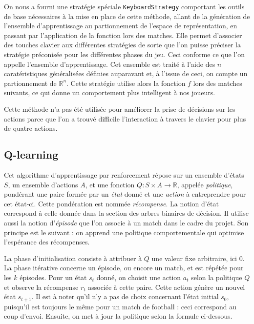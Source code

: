 \documentclass[12pt,a4paper]{article}
\begin{document}
On nous a fourni une strat\'egie sp\'eciale \texttt{KeyboardStrategy} 
comportant les outils de base n\'ecessaires \`a la mise en place de cette 
m\'ethode, allant de la g\'en\'eration de l'ensemble d'apprentissage au 
partionnement de l'espace de repr\'esentation, en passant par l'application de 
la fonction lors des matches. 
Elle permet d'associer des touches clavier aux diff\'erentes strat\'egies de 
sorte que l'on puisse pr\'eciser la strat\'egie pr\'econis\'ee pour les 
diff\'erentes phases du jeu. Ceci conforme ce que l'on appelle l'ensemble 
d'apprentissage. Cet ensemble est trait\'e \`a l'aide des $n$ carat\'eristiques 
g\'en\'eralis\'ees d\'efinies auparavant et, \`a l'issue de ceci, on compte 
un partionnement de $\mathbb{R}^n$. Cette strat\'egie utilise alors la fonction 
$f$ lors des matches suivants, ce qui donne un comportement plus intelligent 
\`a nos joueurs.

Cette m\'ethode n'a pas \'et\'e utilis\'ee pour am\'eliorer la 
prise de d\'ecisions sur les actions parce que l'on a trouv\'e difficile 
l'interaction \`a travers le clavier pour plus de quatre actions.

\subsection*{Q-learning}
Cet algorithme d'apprentissage par renforcement r\'epose sur un ensemble 
d'\'etats $S$, un ensemble d'actions $A$, et une fonction $Q: S \times A \to 
\mathbb{R}$, appel\'ee {\itshape politique}, pond\'erant une paire form\'ee 
par un {\itshape \'etat} donn\'e et une {\itshape action} \`a entreprendre pour 
cet \'etat-ci. Cette pond\'eration est nomm\'ee {\itshape r\'ecompense}. La 
notion d'\'etat correspond \`a celle donn\'ee dans la section des arbres 
binaires de d\'ecision. Il utilise aussi la notion d'{\itshape \'episode} que 
l'on associe \`a un match dans le cadre du projet. Son principe est le suivant : 
on apprend une politique comportementale qui optimise l'esp\'erance des 
r\'ecompenses.

La phase d'initialisation consiste \`a attribuer \`a $Q$ une valeur fixe 
arbitraire, ici 0. La phase it\'erative concerne un \'episode, ou encore un 
match, et est r\'ep\'et\'ee pour les $k$ \'episodes. 
Pour un \'etat $s_t$ donn\'e, on choisit une action $a_t$ selon la politique $Q$ 
et observe la r\'ecompense $r_t$ associ\'ee \`a cette paire. Cette action 
g\'en\`ere un nouvel \'etat $s_{t+1}$. Il est \`a noter qu'il n'y a pas de 
choix concernant l'\'etat initial $s_0$, puisqu'il est toujours le m\^eme pour 
un match de football : ceci correspond au coup d'envoi. Ensuite, on met \`a 
jour la politique selon la formule ci-dessous.
\end{document}
